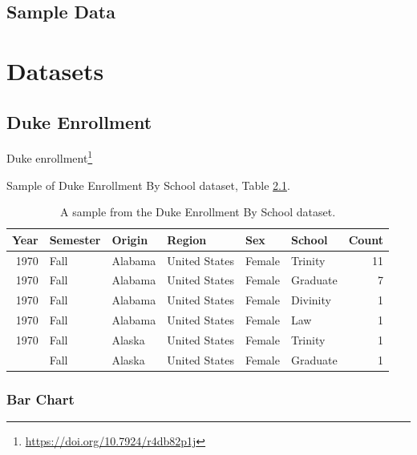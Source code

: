 \documentclass[
]{krantz}
\renewcommand{\href}[2]{#2\footnote{\url{#1}}}
\begin{document}
\hypertarget{sample-data}{%
\section{Sample Data}\label{sample-data}}

\cleardoublepage

\hypertarget{appendix-appendix}{%
\appendix {}}


\hypertarget{datasets}{%
\chapter{Datasets}\label{datasets}}

\hypertarget{duke-enrollment}{%
\section*{Duke Enrollment}\label{duke-enrollment}}


\href{https://doi.org/10.7924/r4db82p1j}{Duke enrollment}

Sample of Duke Enrollment By School dataset, Table \ref{tab:duke-school-tab}.

\begin{table}

\caption{\label{tab:duke-school-tab}A sample from the Duke Enrollment By School dataset.}
\centering
\begin{tabular}[t]{rlllllr}
\toprule
Year & Semester & Origin & Region & Sex & School & Count\\
\midrule
1970 & Fall & Alabama & United States & Female & Trinity & 11\\
1970 & Fall & Alabama & United States & Female & Graduate & 7\\
1970 & Fall & Alabama & United States & Female & Divinity & 1\\
1970 & Fall & Alabama & United States & Female & Law & 1\\
1970 & Fall & Alaska & United States & Female & Trinity & 1\\
\addlinespace
1970 & Fall & Alaska & United States & Female & Graduate & 1\\
\bottomrule
\end{tabular}
\end{table}

\hypertarget{bar-chart-1}{%
\subsection*{Bar Chart}\label{bar-chart-1}}
\end{document}
